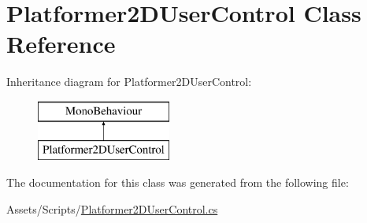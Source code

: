 \hypertarget{class_platformer2_d_user_control}{}\section{Platformer2\+D\+User\+Control Class Reference}
\label{class_platformer2_d_user_control}
Inheritance diagram for Platformer2\+D\+User\+Control\+:\begin{figure}[H]
\begin{center}
\leavevmode
\includegraphics[height=2.000000cm]{class_platformer2_d_user_control}
\end{center}
\end{figure}


The documentation for this class was generated from the following file\+:\begin{DoxyCompactItemize}
\item 
Assets/\+Scripts/\hyperlink{_platformer2_d_user_control_8cs}{Platformer2\+D\+User\+Control.\+cs}\end{DoxyCompactItemize}
